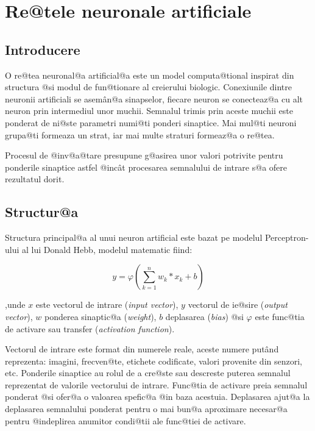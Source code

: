 	

\chapter{Re@tele neuronale artificiale}


\section{Introducere}

O re@tea neuronal@a artificial@a este un model computa@tional inspirat din structura @si modul de fun@tionare al creierului biologic. Conexiunile dintre neuronii artificiali se asem\^ an@a sinapselor, fiecare neuron se conecteaz@a cu alt neuron prin intermediul unor muchii. Semnalul trimis prin aceste muchii este ponderat de ni@ste parametri numi@ti ponderi sinaptice. Mai mul@ti neuroni grupa@ti formeaza un strat, iar mai multe straturi formeaz@a o re@tea.

Procesul de @inv@a@tare presupune g@asirea unor valori potrivite pentru ponderile sinaptice astfel @inc\^ at procesarea semnalului de intrare s@a ofere rezultatul dorit.


\section{Structur@a}

Structura principal@a al unui neuron artificial este bazat pe modelul Perceptron-ului al lui Donald Hebb, modelul matematic fiind:

$$
	y = \varphi \left( \sum_{k=1}^{n} w_k * x_k + b \right)
$$

,unde $x$ este vectorul de intrare ({\sl input vector}), $y$ vectorul de ie@sire ({\sl output vector}), $w$ ponderea sinaptic@a ({\sl weight}), $b$ deplasarea ({\sl bias}) @si $\varphi$ este func@tia de activare sau transfer ({\sl activation function}).

Vectorul de intrare este format din numerele reale, aceste numere put\^ and reprezenta: imagini, frecven@te, etichete codificate, valori provenite din senzori, etc. Ponderile sinaptice au rolul de a cre@ste sau descreste puterea semnalul reprezentat de valorile vectorului de intrare. Func@tia de activare preia semnalul ponderat @si ofer@a o valoarea spefic@a @in baza acestuia. Deplasarea ajut@a la deplasarea semnalului ponderat pentru o mai bun@a aproximare necesar@a pentru @indeplirea anumitor condi@tii ale func@tiei de activare.

